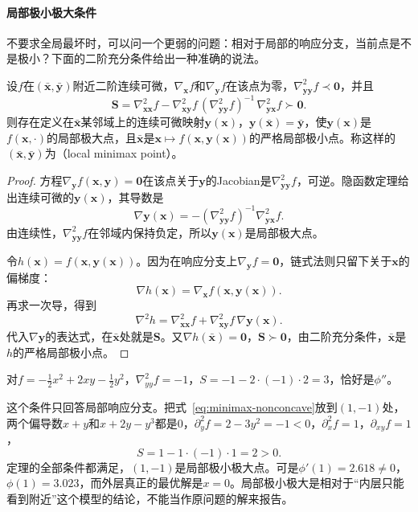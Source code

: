 \paragraph{局部极小极大条件}
不要求全局最坏时，可以问一个更弱的问题：相对于局部的响应分支，当前点是不是极小？下面的二阶充分条件给出一种准确的说法。

\begin{theorem}[局部极小极大的二阶充分条件]
\label{thm:minimax-local}
设$f$在$(\bar{\bm{x}},\bar{\bm{y}})$附近二阶连续可微，$\nabla_{\bm{x}}f$和$\nabla_{\bm{y}}f$在该点为零，$\nabla^2_{\bm{y}\bm{y}}f\prec\bm{0}$，并且
\begin{equation}
 \bm{S}=\nabla^2_{\bm{x}\bm{x}}f-\nabla^2_{\bm{x}\bm{y}}f\,(\nabla^2_{\bm{y}\bm{y}}f)^{-1}\,\nabla^2_{\bm{y}\bm{x}}f\succ\bm{0}.
 \label{eq:minimax-schur}
\end{equation}
则存在定义在$\bar{\bm{x}}$某邻域上的连续可微映射$\bm{y}(\bm{x})$，$\bm{y}(\bar{\bm{x}})=\bar{\bm{y}}$，使$\bm{y}(\bm{x})$是$f(\bm{x},\cdot)$的局部极大点，且$\bar{\bm{x}}$是$\bm{x}\mapsto f(\bm{x},\bm{y}(\bm{x}))$的严格局部极小点。称这样的$(\bar{\bm{x}},\bar{\bm{y}})$为（local minimax point）。
\end{theorem}

\begin{proof}
方程$\nabla_{\bm{y}}f(\bm{x},\bm{y})=\bm{0}$在该点关于$\bm{y}$的Jacobian是$\nabla^2_{\bm{y}\bm{y}}f$，可逆。隐函数定理给出连续可微的$\bm{y}(\bm{x})$，其导数是
\[
 \nabla\bm{y}(\bm{x})=-(\nabla^2_{\bm{y}\bm{y}}f)^{-1}\nabla^2_{\bm{y}\bm{x}}f.
\]
由连续性，$\nabla^2_{\bm{y}\bm{y}}f$在邻域内保持负定，所以$\bm{y}(\bm{x})$是局部极大点。

令$h(\bm{x})=f(\bm{x},\bm{y}(\bm{x}))$。因为在响应分支上$\nabla_{\bm{y}}f=\bm{0}$，链式法则只留下关于$\bm{x}$的偏梯度：
\[
 \nabla h(\bm{x})=\nabla_{\bm{x}}f(\bm{x},\bm{y}(\bm{x})).
\]
再求一次导，得到
\[
 \nabla^2h=\nabla^2_{\bm{x}\bm{x}}f+\nabla^2_{\bm{x}\bm{y}}f\,\nabla\bm{y}(\bm{x}).
\]
代入$\nabla\bm{y}$的表达式，在$\bar{\bm{x}}$处就是$\bm{S}$。又$\nabla h(\bar{\bm{x}})=\bm{0}$，$\bm{S}\succ\bm{0}$，由二阶充分条件，$\bar{\bm{x}}$是$h$的严格局部极小点。
\end{proof}

对$f=-\frac12x^2+2xy-\frac12y^2$，$\nabla^2_{yy}f=-1$，$S=-1-2\cdot(-1)\cdot2=3$，恰好是$\phi''$。

这个条件只回答局部响应分支。把式~\eqref{eq:minimax-nonconcave}放到$(1,-1)$处，两个偏导数$x+y$和$x+2y-y^3$都是$0$，$\partial_y^2f=2-3y^2=-1<0$，$\partial_x^2f=1$，$\partial_{xy}f=1$，
\[
 S=1-1\cdot(-1)\cdot1=2>0.
\]
定理的全部条件都满足，$(1,-1)$是局部极小极大点。可是$\phi'(1)=2.618\neq0$，$\phi(1)=3.023$，而外层真正的最优解是$x=0$。局部极小极大是相对于“内层只能看到附近”这个模型的结论，不能当作原问题的解来报告。


